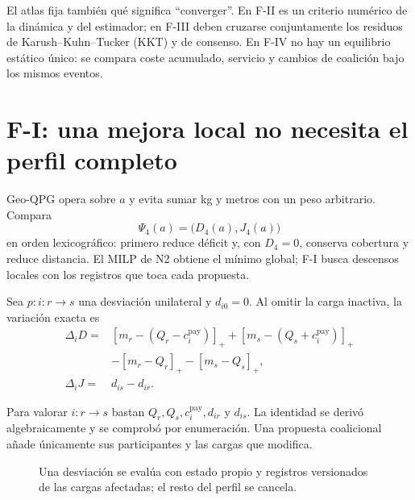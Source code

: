 El atlas fija también qué significa ``converger''. En F-II es un criterio
numérico de la dinámica y del estimador; en F-III deben cruzarse conjuntamente
los residuos de Karush--Kuhn--Tucker (KKT) y de consenso. En F-IV no hay un
equilibrio estático único:
se compara coste acumulado, servicio y cambios de coalición bajo los mismos
eventos.

\clearpage

\section*{F-I: una mejora local no necesita el perfil completo}
\enlargethispage{2\baselineskip}

Geo-QPG opera sobre $a$ y evita sumar kg y metros con un peso arbitrario. Compara
\begin{equation}
\label{eq:n4-state-v2}
\Psi_4(a)=\bigl(D_4(a),J_4(a)\bigr)
\end{equation}
en orden lexicográfico: primero reduce déficit y, con $D_4=0$, conserva cobertura
y reduce distancia. El MILP de N2 obtiene el mínimo global; F-I busca descensos
locales con los registros que toca cada propuesta.

Sea $p:i:r\rightarrow s$ una desviación unilateral y $d_{i0}=0$. Al omitir la
carga inactiva, la variación exacta es
\begin{equation}
\label{eq:n4-unilateral-delta}
\begin{aligned}
\Delta_iD={}&[m_r-(Q_r-c_i^{\mathrm{pay}})]_+
 +[m_s-(Q_s+c_i^{\mathrm{pay}})]_+\\[-1mm]
&-[m_r-Q_r]_+-[m_s-Q_s]_+,\\
\Delta_iJ={}&d_{is}-d_{ir}.
\end{aligned}
\end{equation}

Para valorar $i:r\rightarrow s$ bastan $Q_r,Q_s,c_i^{\mathrm{pay}},d_{ir}$ y
$d_{is}$. La identidad se derivó algebraicamente y se comprobó por enumeración.
Una propuesta coalicional añade únicamente sus participantes y las cargas que
modifica.

\begin{figure}[H]
\centering
\scalebox{.88}{}
\caption{Una desviación se evalúa con estado propio y registros versionados de
las cargas afectadas; el resto del perfil se cancela.}
\label{fig:n4-sufficient-information}
\viuownsource
\end{figure}

